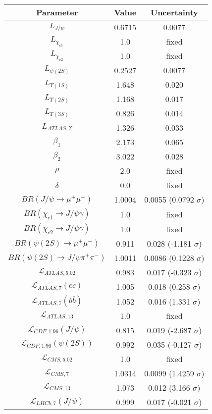 \begin{table}[h!]
\centering
\begin{tabular}{c|c|c}
Parameter & Value & Uncertainty \\
\hline
$L_{J/\psi}$ & 0.6715 & 0.0077 \\
$L_{\chi_{c1}}$ & 1.0 & fixed \\
$L_{\chi_{c2}}$ & 1.0 & fixed \\
$L_{\psi(2S)}$ & 0.2527 & 0.0077 \\
$L_{\Upsilon(1S)}$ & 1.648 & 0.020 \\
$L_{\Upsilon(2S)}$ & 1.168 & 0.017 \\
$L_{\Upsilon(3S)}$ & 0.826 & 0.014 \\
$L_{ATLAS,\Upsilon}$ & 1.326 & 0.033 \\
$\beta_1$ & 2.173 & 0.065 \\
$\beta_2$ & 3.022 & 0.028 \\
$\rho$ & 2.0 & fixed \\
$\delta$ & 0.0 & fixed \\
$BR(J/\psi\rightarrow\mu^+\mu^-)$ & 1.0004 & 0.0055 (0.0792 $\sigma$) \\
$BR(\chi_{c1}\rightarrow J/\psi\gamma)$ & 1.0 & fixed \\
$BR(\chi_{c2}\rightarrow J/\psi\gamma)$ & 1.0 & fixed \\
$BR(\psi(2S)\rightarrow\mu^+\mu^-)$ & 0.911 & 0.028 (-1.181 $\sigma$) \\
$BR(\psi(2S)\rightarrow J/\psi\pi^+\pi^-)$ & 1.0011 & 0.0086 (0.1228 $\sigma$) \\
$\mathcal L_{ATLAS,5.02}$ & 0.983 & 0.017 (-0.323 $\sigma$) \\
$\mathcal L_{ATLAS,7}(c\overline c)$ & 1.005 & 0.018 (0.258 $\sigma$) \\
$\mathcal L_{ATLAS,7}(b\overline b)$ & 1.052 & 0.016 (1.331 $\sigma$) \\
$\mathcal L_{ATLAS,13}$ & 1.0 & fixed \\
$\mathcal L_{CDF,1.96}(J/\psi)$ & 0.815 & 0.019 (-2.687 $\sigma$) \\
$\mathcal L_{CDF,1.96}(\psi(2S))$ & 0.992 & 0.035 (-0.127 $\sigma$) \\
$\mathcal L_{CMS,5.02}$ & 1.0 & fixed \\
$\mathcal L_{CMS,7}$ & 1.0314 & 0.0099 (1.4259 $\sigma$) \\
$\mathcal L_{CMS,13}$ & 1.073 & 0.012 (3.166 $\sigma$) \\
$\mathcal L_{LHCb,7}(J/\psi)$ & 0.999 & 0.017 (-0.021 $\sigma$) \\

\end{tabular}
\end{table}
